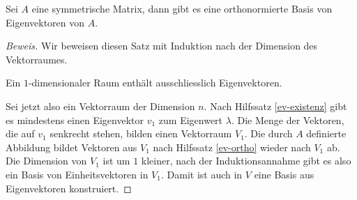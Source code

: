 \begin{satz}
\label{satz:symmetrischdiagonalisierbar}
Sei $A$ eine symmetrische Matrix, dann gibt es eine orthonormierte Basis
von Eigenvektoren von $A$.
\end{satz}

\begin{proof}[Beweis]
Wir beweisen diesen Satz mit Induktion nach der Dimension des Vektorraumes.

Ein $1$-dimensionaler Raum enthält ausschliesslich Eigenvektoren.

Sei jetzt also ein Vektorraum der Dimension $n$.
Nach Hilfssatz \ref{ev-existenz} gibt es mindestens einen Eigenvektor $v_1$
zum Eigenwert $\lambda$.
Die Menge der Vektoren, die auf $v_1$ senkrecht
stehen, bilden einen Vektorraum $V_1$.
Die durch $A$ definierte Abbildung
bildet Vektoren aus $V_1$ nach Hilfssatz \ref{ev-ortho} wieder nach
$V_1$ ab.
Die Dimension von $V_1$ ist um $1$ kleiner, nach der
Induktionsannahme gibt es also ein Basis von Einheitsvektoren in $V_1$.
Damit ist auch in $V$ eine Basis aus Eigenvektoren konstruiert.
\end{proof}

